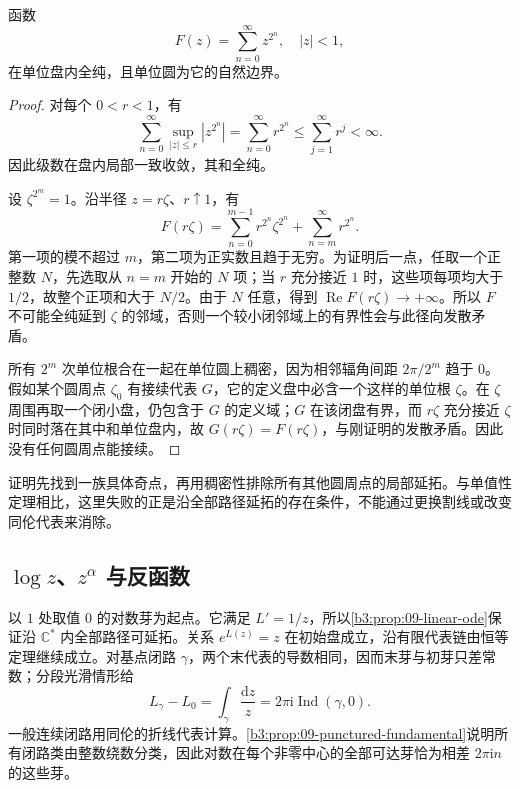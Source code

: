 \begin{proposition}[稀疏幂级数的自然边界]\label{b3:prop:09-lacunary-natural-boundary}
函数
\[
 F(z)=\sum_{n=0}^{\infty}z^{2^n},\quad |z|<1,
\]
在单位盘内全纯，且单位圆为它的自然边界。
\end{proposition}
\begin{proof}
对每个 \(0<r<1\)，有
\[
 \sum_{n=0}^{\infty}\sup_{|z|\le r}|z^{2^n}|
 =\sum_{n=0}^{\infty}r^{2^n}
 \le\sum_{j=1}^{\infty}r^j<\infty.
\]
因此级数在盘内局部一致收敛，其和全纯。

设 \(\zeta^{2^m}=1\)。沿半径 \(z=r\zeta\)、\(r\uparrow1\)，有
\[
 F(r\zeta)=\sum_{n=0}^{m-1}r^{2^n}\zeta^{2^n}
 +\sum_{n=m}^{\infty}r^{2^n}.
\]
第一项的模不超过 \(m\)，第二项为正实数且趋于无穷。为证明后一点，任取一个正整数 \(N\)，先选取从 \(n=m\) 开始的 \(N\) 项；当 \(r\) 充分接近 \(1\) 时，这些项每项均大于 \(1/2\)，故整个正项和大于 \(N/2\)。由于 \(N\) 任意，得到 \(\operatorname{Re}F(r\zeta)\rightarrow+\infty\)。所以 \(F\) 不可能全纯延到 \(\zeta\) 的邻域，否则一个较小闭邻域上的有界性会与此径向发散矛盾。

所有 \(2^m\) 次单位根合在一起在单位圆上稠密，因为相邻辐角间距 \(2\pi/2^m\) 趋于 \(0\)。假如某个圆周点 \(\zeta_0\) 有接续代表 \(G\)，它的定义盘中必含一个这样的单位根 \(\zeta\)。在 \(\zeta\) 周围再取一个闭小盘，仍包含于 \(G\) 的定义域；\(G\) 在该闭盘有界，而 \(r\zeta\) 充分接近 \(\zeta\) 时同时落在其中和单位盘内，故 \(G(r\zeta)=F(r\zeta)\)，与刚证明的发散矛盾。因此没有任何圆周点能接续。
\end{proof}

证明先找到一族具体奇点，再用稠密性排除所有其他圆周点的局部延拓。与单值性定理相比，这里失败的正是沿全部路径延拓的存在条件，不能通过更换割线或改变同伦代表来消除。

\subsection{\texorpdfstring{\(\log z\)}{log z}、\texorpdfstring{\(z^\alpha\)}{z 的 \AnalysisPdfAlpha 次幂} 与反函数}
\label{b3:subsec:090304}

以 \(1\) 处取值 \(0\) 的对数芽为起点。它满足 \(L'=1/z\)，所以\cref{b3:prop:09-linear-ode}保证沿 \(\mathbb C^*\) 内全部路径可延拓。关系 \(e^{L(z)}=z\) 在初始盘成立，沿有限代表链由恒等定理继续成立。对基点闭路 \(\gamma\)，两个末代表的导数相同，因而末芽与初芽只差常数；分段光滑情形给
\[
 L_\gamma-L_0=\int_\gamma\frac{\mathrm dz}{z}
 =2\pi\mathrm{i}\operatorname{Ind}(\gamma,0).
\]
一般连续闭路用同伦的折线代表计算。\cref{b3:prop:09-punctured-fundamental}说明所有闭路类由整数绕数分类，因此对数在每个非零中心的全部可达芽恰为相差 \(2\pi\mathrm{i}n\) 的这些芽。

